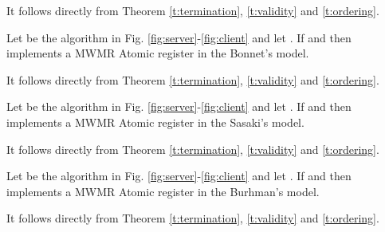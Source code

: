 \begin{proofT}
	It follows directly from Theorem \ref{t:termination}, \ref{t:validity} and \ref{t:ordering}.
	\renewcommand{\toto}{th:Garay}	
\end{proofT}

\begin{theorem}\label{th:Bonnet}
Let  be the algorithm in Fig. \ref{fig:server}-\ref{fig:client} and let .
	If  and  then  implements a MWMR Atomic register in the Bonnet's model.
\end{theorem}

\begin{proofT}
	It follows directly from Theorem \ref{t:termination}, \ref{t:validity} and \ref{t:ordering}.
	\renewcommand{\toto}{th:Bonnet}	
\end{proofT}

\begin{theorem}\label{th:Sasaki}
Let  be the algorithm in Fig. \ref{fig:server}-\ref{fig:client} and let .
	If  and  then  implements a MWMR Atomic register in the Sasaki's model.
\end{theorem}

\begin{proofT}
	It follows directly from Theorem \ref{t:termination}, \ref{t:validity} and \ref{t:ordering}.
	\renewcommand{\toto}{th:Sasaki}	
\end{proofT}

\begin{theorem}\label{th:Burhman}
Let  be the algorithm in Fig. \ref{fig:server}-\ref{fig:client} and let .
	If  and  then  implements a MWMR Atomic register in the Burhman's model.\end{theorem}

\begin{proofT}
	It follows directly from Theorem \ref{t:termination}, \ref{t:validity} and \ref{t:ordering}.
	\renewcommand{\toto}{th:Burhman}	
\end{proofT}

